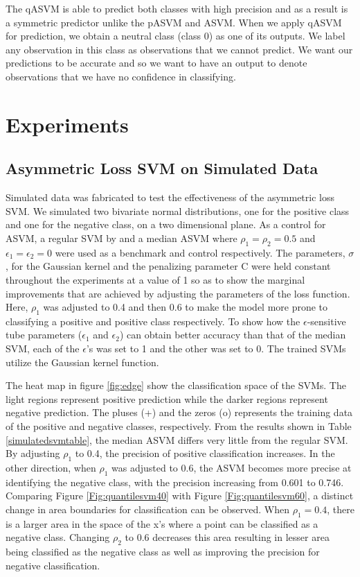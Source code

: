 \documentclass[twoside,11pt]{article}
\begin{document}
The qASVM is able to predict both classes with high precision and as a result is a symmetric predictor unlike the pASVM and ASVM. When we apply qASVM for prediction, we obtain a neutral class (class 0) as one of its outputs. We label any observation in this class as observations that we cannot predict. We want our predictions to be accurate and so we want to have an output to denote observations that we have no confidence in classifying.

\section{Experiments}
\subsection{Asymmetric Loss SVM on Simulated Data}\label{simulation}
Simulated data was fabricated to test the effectiveness of the asymmetric loss SVM. We simulated two bivariate normal distributions, one for the positive class and one for the negative class, on a two dimensional plane. As a control for ASVM, a regular SVM by \citet{Vapnik98} and a median ASVM where $\rho_1=\rho_2=0.5$ and $\epsilon_1=\epsilon_2=0$ were used as a benchmark and control respectively. The parameters, $\sigma$, for the Gaussian kernel and the penalizing parameter C were held constant throughout the experiments at a value of 1 so as to show the marginal improvements that are achieved by adjusting the parameters of the loss function. Here, $\rho_1$ was adjusted to 0.4 and then 0.6 to make the model more prone to classifying a positive and positive class respectively. To show how the $\epsilon$-sensitive tube parameters ($\epsilon_1$ and $\epsilon_2$) can obtain better accuracy than that of the median SVM, each of the $\epsilon$'s was set to 1 and the other was set to 0. The trained SVMs utilize the Gaussian kernel function. 

The heat map in figure \ref{fig:edge} show the classification space of the SVMs. The light regions represent positive prediction while the darker regions represent negative prediction. The pluses (+) and the zeros (o) represents the training data of the positive and negative classes, respectively. From the results shown in Table \ref{simulatedsvmtable}, the median ASVM differs very little from the regular SVM. By adjusting $\rho_1$ to 0.4, the precision of positive classification increases. In the other direction, when $\rho_1$ was adjusted to 0.6, the ASVM becomes more precise at identifying the negative class, with the precision increasing from 0.601 to 0.746. Comparing Figure \ref{Fig:quantilesvm40} with Figure \ref{Fig:quantilesvm60}, a distinct change in area boundaries for classification can be observed. When $\rho_1=0.4$, there is a larger area in the space of the x's where a point can be classified as a negative class. Changing $\rho_2$ to 0.6 decreases this area resulting in lesser area being classified as the negative class as well as improving the precision for negative classification.
\end{document}
